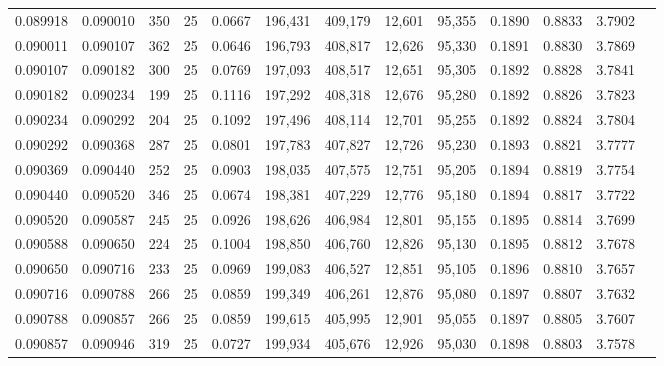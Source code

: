 \begin{tabular}{rrrrrrrrrrrrr}
0.089918 & 0.090010 &   350 &  25 &                                     0.0667 & 196,431 & 409,179 &  12,601 &  95,355 & 0.1890 & 0.8833 & 3.7902 \\
0.090011 & 0.090107 &   362 &  25 &                                     0.0646 & 196,793 & 408,817 &  12,626 &  95,330 & 0.1891 & 0.8830 & 3.7869 \\
0.090107 & 0.090182 &   300 &  25 &                                     0.0769 & 197,093 & 408,517 &  12,651 &  95,305 & 0.1892 & 0.8828 & 3.7841 \\
0.090182 & 0.090234 &   199 &  25 &                                     0.1116 & 197,292 & 408,318 &  12,676 &  95,280 & 0.1892 & 0.8826 & 3.7823 \\
0.090234 & 0.090292 &   204 &  25 &                                     0.1092 & 197,496 & 408,114 &  12,701 &  95,255 & 0.1892 & 0.8824 & 3.7804 \\
0.090292 & 0.090368 &   287 &  25 &                                     0.0801 & 197,783 & 407,827 &  12,726 &  95,230 & 0.1893 & 0.8821 & 3.7777 \\
0.090369 & 0.090440 &   252 &  25 &                                     0.0903 & 198,035 & 407,575 &  12,751 &  95,205 & 0.1894 & 0.8819 & 3.7754 \\
0.090440 & 0.090520 &   346 &  25 &                                     0.0674 & 198,381 & 407,229 &  12,776 &  95,180 & 0.1894 & 0.8817 & 3.7722 \\
0.090520 & 0.090587 &   245 &  25 &                                     0.0926 & 198,626 & 406,984 &  12,801 &  95,155 & 0.1895 & 0.8814 & 3.7699 \\
0.090588 & 0.090650 &   224 &  25 &                                     0.1004 & 198,850 & 406,760 &  12,826 &  95,130 & 0.1895 & 0.8812 & 3.7678 \\
0.090650 & 0.090716 &   233 &  25 &                                     0.0969 & 199,083 & 406,527 &  12,851 &  95,105 & 0.1896 & 0.8810 & 3.7657 \\
0.090716 & 0.090788 &   266 &  25 &                                     0.0859 & 199,349 & 406,261 &  12,876 &  95,080 & 0.1897 & 0.8807 & 3.7632 \\
0.090788 & 0.090857 &   266 &  25 &                                     0.0859 & 199,615 & 405,995 &  12,901 &  95,055 & 0.1897 & 0.8805 & 3.7607 \\
0.090857 & 0.090946 &   319 &  25 &                                     0.0727 & 199,934 & 405,676 &  12,926 &  95,030 & 0.1898 & 0.8803 & 3.7578 \\

\end{tabular}
